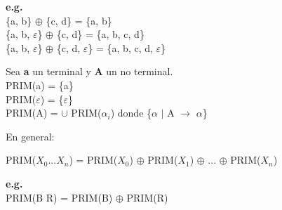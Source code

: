 \documentclass[\main/ApuntesPL.tex]{subfiles}
\begin{document}
    \par
    \textbf{e.g.}\\
    \hspace{5mm}\{a, b\} $\oplus$ \{c, d\} = \{a, b\}\\
    \hspace{5mm}\{a, b, $\varepsilon$\} $\oplus$ \{c, d\} = \{a, b, c, d\}\\
    \hspace{5mm}\{a, b, $\varepsilon$\} $\oplus$ \{c, d, $\varepsilon$\} = \{a, b, c, d,
      $\varepsilon$\}

    \bigskip
    \par
    Sea \textbf{a} un terminal y \textbf{A} un no terminal.\\
    \hspace{5mm}PRIM(a) = \{a\}\\
    \hspace{5mm}PRIM($\varepsilon$) = \{$\varepsilon$\}\\
    \hspace{5mm}PRIM(A) = $\cup$ PRIM($\alpha_i$) \hspace{5mm}donde \{$\alpha$ $\mid$ A
      $\rightarrow$ $\alpha$\}\\

    \bigskip
    \par
    En general:\\
    \begin{center}
      \large
      PRIM($X_0$...$X_n$) = PRIM($X_0$) $\oplus$ PRIM($X_1$) $\oplus$ ... $\oplus$ PRIM($X_n$)
    \end{center}

    \par
    \textbf{e.g.}\\
    \hspace{5mm}PRIM(B R) = PRIM(B) $\oplus$ PRIM(R)
\end{document}
